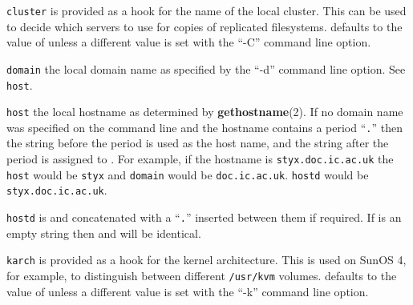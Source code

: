 \begin{list}{}
\item[\tt cluster\hfill]
is provided as a hook for the name of the local cluster.  This can
be used to decide which servers to use for copies of replicated filesystems.
 defaults to the value of  unless a different
value is set with the ``-C'' command line option.

\item[\tt domain\hfill]
the local domain name as specified by the ``-d'' command line option.
See {\tt host}.

\item[\tt host\hfill]
the local hostname as determined by {\bf gethostname}(2).
If no domain name was specified on the command line
and the hostname contains a period ``{\tt .}'' then the string
before the period is used as the host name, and the string
after the period is assigned to .
For example, if the hostname is {\tt styx.doc.ic.ac.uk} the {\tt host}
would be {\tt styx} and {\tt domain} would be {\tt doc.ic.ac.uk}.
{\tt hostd} would be {\tt styx.doc.ic.ac.uk}.

\item[\tt hostd\hfill]
is  and  concatenated with a ``{\tt .}'' inserted between them
if required.
If  is an empty string then  and  will
be identical.

\item[\tt karch\hfill]
is provided as a hook for the kernel architecture.  This is used
on SunOS 4, for example, to distinguish between different {\tt /usr/kvm} volumes.
 defaults to the value of  unless a different
value is set with the ``-k'' command line option.


\end{list}
